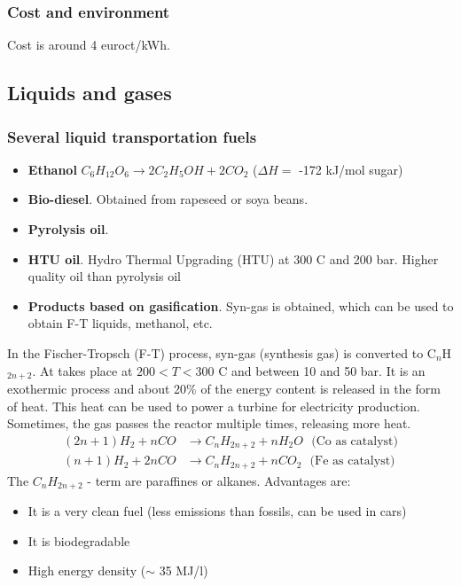 \documentclass[a4paper,10pt]{article}
\begin{document}
\subsubsection{Cost and environment}
Cost is around 4 euroct/kWh.


\subsection{Liquids and gases}
\subsubsection{Several liquid transportation fuels}
\begin{itemize}
 \item \textbf{Ethanol} $C_6H_{12}O_6 \rightarrow 2C_2H_5OH + 2CO_2$ ($\Delta H =$ -172 kJ/mol sugar)
 \item \textbf{Bio-diesel}. Obtained from rapeseed or soya beans.
 \item \textbf{Pyrolysis oil}.
 \item \textbf{HTU oil}. Hydro Thermal Upgrading (HTU) at 300 C and 200 bar. Higher quality oil than pyrolysis oil
 \item \textbf{Products based on gasification}. Syn-gas is obtained, which can be used to obtain F-T liquids, methanol, etc.
\end{itemize}

In the Fischer-Tropsch (F-T) process, syn-gas (synthesis gas) is converted to C$_n$H$_{2n+2}$. At takes place at $200<T<300$ C and between 10 and 50 bar. It is an exothermic process and about 20\% of the energy content is released in the form of heat. This heat can be used to power a turbine for electricity production. Sometimes, the gas passes the reactor multiple times, releasing more heat.
\begin{align}
 (2n+1)H_2 + nCO &\rightarrow C_nH_{2n+2} + nH_2O \ \ \ \text{(Co as catalyst)} \\
 (n+1)H_2 + 2nCO &\rightarrow C_nH_{2n+2} + nCO_2 \ \ \ \text{(Fe as catalyst)}
\end{align}
The $C_nH_{2n+2}$ - term are paraffines or alkanes. Advantages are:
\begin{itemize}
 \item It is a very clean fuel (less emissions than fossils, can be used in cars)
 \item It is biodegradable
 \item High energy density ($\sim$ 35 MJ/l)
\end{itemize}
\end{document}
